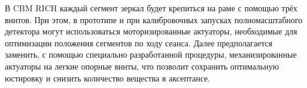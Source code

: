 




В CBM RICH каждый сегмент зеркал будет крепиться на раме с помощью трёх винтов. При этом, в прототипе и при калибровочных запусках полномасштабного детектора могут использоваться моторизированные актуаторы, необходимые для оптимизации положения сегментов по ходу сеанса. Далее предполагается заменить, с помощью специально разработанной процедуры, механизированные актуаторы на легкие опорные винты, что позволит сохранить оптимальную юстировку и снизить количество вещества в аксептансе.




